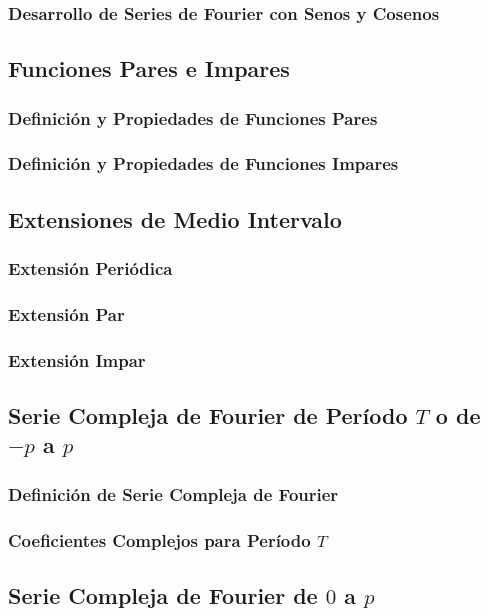 \subsubsection{Desarrollo de Series de Fourier con Senos y Cosenos}

\subsection{Funciones Pares e Impares}
\subsubsection{Definición y Propiedades de Funciones Pares}
\subsubsection{Definición y Propiedades de Funciones Impares}

\subsection{Extensiones de Medio Intervalo}
\subsubsection{Extensión Periódica}
\subsubsection{Extensión Par}
\subsubsection{Extensión Impar}

\subsection{Serie Compleja de Fourier de Período $T$ o de $-p$ a $p$}
\subsubsection{Definición de Serie Compleja de Fourier}
\subsubsection{Coeficientes Complejos para Período $T$}

\subsection{Serie Compleja de Fourier de $0$ a $p$}

